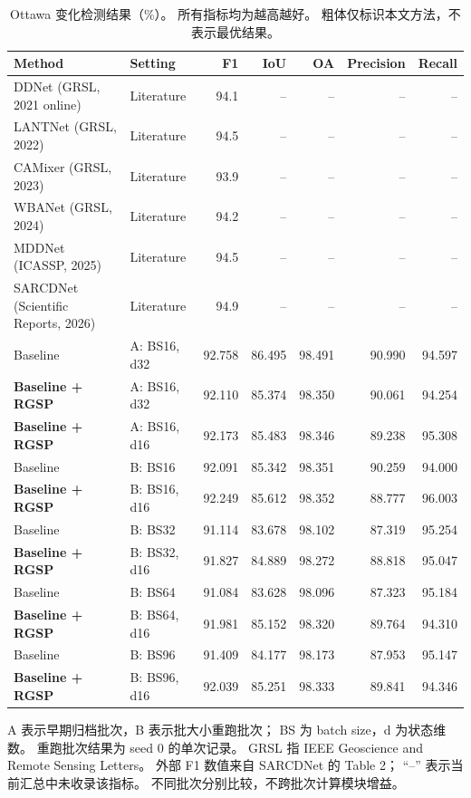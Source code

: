 \documentclass[journal]{IEEEtran}
\begin{document}
\begin{table}[tp]
\centering
\footnotesize
\setlength{\tabcolsep}{2pt}
\renewcommand{\arraystretch}{1.12}
\caption{Ottawa 变化检测结果（\%）。
所有指标均为越高越好。
粗体仅标识本文方法，不表示最优结果。}
\label{tab:ottawa_comparison}
\begin{tabularx}{\linewidth}{@{}Xlrrrrr@{}}
\toprule
Method & Setting & F1 & IoU & OA & Precision & Recall \\
\midrule
DDNet (GRSL, 2021 online)
& Literature & 94.1 & -- & -- & -- & -- \\
LANTNet (GRSL, 2022)
& Literature & 94.5 & -- & -- & -- & -- \\
CAMixer (GRSL, 2023)
& Literature & 93.9 & -- & -- & -- & -- \\
WBANet (GRSL, 2024)
& Literature & 94.2 & -- & -- & -- & -- \\
MDDNet (ICASSP, 2025)
& Literature & 94.5 & -- & -- & -- & -- \\
SARCDNet (Scientific Reports, 2026)
& Literature & 94.9 & -- & -- & -- & -- \\
\midrule
Baseline
& A: BS16, d32
& 92.758 & 86.495 & 98.491 & 90.990 & 94.597 \\
\textbf{Baseline + RGSP}
& A: BS16, d32
& 92.110 & 85.374 & 98.350 & 90.061 & 94.254 \\
\textbf{Baseline + RGSP}
& A: BS16, d16
& 92.173 & 85.483 & 98.346 & 89.238 & 95.308 \\
\midrule
Baseline
& B: BS16
& 92.091 & 85.342 & 98.351 & 90.259 & 94.000 \\
\textbf{Baseline + RGSP}
& B: BS16, d16
& 92.249 & 85.612 & 98.352 & 88.777 & 96.003 \\
Baseline
& B: BS32
& 91.114 & 83.678 & 98.102 & 87.319 & 95.254 \\
\textbf{Baseline + RGSP}
& B: BS32, d16
& 91.827 & 84.889 & 98.272 & 88.818 & 95.047 \\
Baseline
& B: BS64
& 91.084 & 83.628 & 98.096 & 87.323 & 95.184 \\
\textbf{Baseline + RGSP}
& B: BS64, d16
& 91.981 & 85.152 & 98.320 & 89.764 & 94.310 \\
Baseline
& B: BS96
& 91.409 & 84.177 & 98.173 & 87.953 & 95.147 \\
\textbf{Baseline + RGSP}
& B: BS96, d16
& 92.039 & 85.251 & 98.333 & 89.841 & 94.346 \\
\bottomrule
\end{tabularx}

\smallskip
\begin{minipage}{\linewidth}
\footnotesize
A 表示早期归档批次，B 表示批大小重跑批次；
BS 为 batch size，d 为状态维数。
重跑批次结果为 seed 0 的单次记录。
GRSL 指 IEEE Geoscience and Remote Sensing Letters。
外部 F1 数值来自 SARCDNet 的 Table 2；
``--'' 表示当前汇总中未收录该指标。
不同批次分别比较，不跨批次计算模块增益。
\end{minipage}
\end{table}
\end{document}
